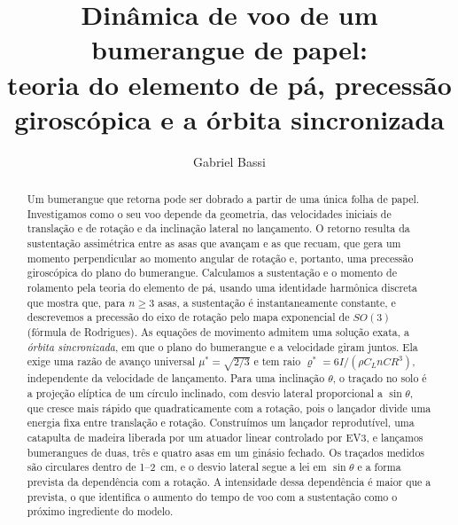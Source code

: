 \documentclass[aps,pre,twocolumn,superscriptaddress,nofootinbib,floatfix]{revtex4-2}
\begin{document}
\renewcommand{\figurename}{Fig.}
\renewcommand{\tablename}{Tabela}

\title{Dinâmica de voo de um bumerangue de papel:\\ teoria do elemento de pá, precessão giroscópica e a órbita sincronizada}

\author{Gabriel Bassi}


\begin{abstract}
Um bumerangue que retorna pode ser dobrado a partir de uma única folha de papel. Investigamos como o seu voo depende da geometria, das velocidades iniciais de translação e de rotação e da inclinação lateral no lançamento. O retorno resulta da sustentação assimétrica entre as asas que avançam e as que recuam, que gera um momento perpendicular ao momento angular de rotação e, portanto, uma precessão giroscópica do plano do bumerangue. Calculamos a sustentação e o momento de rolamento pela teoria do elemento de pá, usando uma identidade harmônica discreta que mostra que, para $n\geq3$ asas, a sustentação é instantaneamente constante, e descrevemos a precessão do eixo de rotação pelo mapa exponencial de $SO(3)$ (fórmula de Rodrigues). As equações de movimento admitem uma solução exata, a \emph{órbita sincronizada}, em que o plano do bumerangue e a velocidade giram juntos. Ela exige uma razão de avanço universal $\mu^\ast=\sqrt{2/3}$ e tem raio $\varrho^\ast=6I/(\rho C_L nCR^3)$, independente da velocidade de lançamento. Para uma inclinação $\theta$, o traçado no solo é a projeção elíptica de um círculo inclinado, com desvio lateral proporcional a $\sin\theta$, que cresce mais rápido que quadraticamente com a rotação, pois o lançador divide uma energia fixa entre translação e rotação. Construímos um lançador reprodutível, uma catapulta de madeira liberada por um atuador linear controlado por EV3, e lançamos bumerangues de duas, três e quatro asas em um ginásio fechado. Os traçados medidos são circulares dentro de 1--\SI{2}{cm}, e o desvio lateral segue a lei em $\sin\theta$ e a forma prevista da dependência com a rotação. A intensidade dessa dependência é maior que a prevista, o que identifica o aumento do tempo de voo com a sustentação como o próximo ingrediente do modelo.
\end{abstract}

\maketitle
\end{document}
